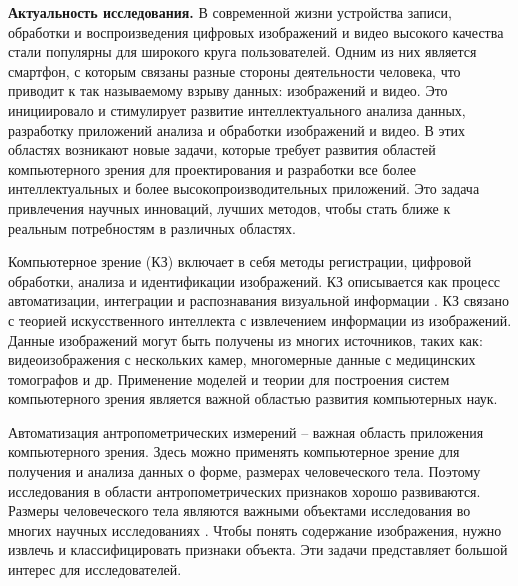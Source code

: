 
\textbf{Актуальность исследования.}
В современной жизни устройства записи, обработки и воспроизведения цифровых изображений и видео высокого качества стали популярны для широкого круга пользователей. Одним из них является смартфон, с которым связаны разные стороны деятельности человека, что приводит к так называемому взрыву данных: изображений и видео. Это инициировало и стимулирует развитие интеллектуального анализа данных, разработку приложений анализа и обработки изображений и видео. В этих областях возникают новые задачи, которые требует развития областей компьютерного зрения для проектирования и разработки все более интеллектуальных и более высокопроизводительных приложений. Это задача привлечения научных инноваций, лучших методов, чтобы стать ближе к реальным потребностям в различных областях.

Компьютерное зрение (КЗ) включает в себя методы регистрации, цифровой обработки, анализа и идентификации изображений. КЗ описывается как процесс автоматизации, интеграции и распознавания визуальной информации \cite{Wang2016,Maria2016,Ioan2011,Lauren2013,Saha2005,Azriel2001}. КЗ связано с теорией искусственного интеллекта с извлечением информации из изображений. Данные изображений могут быть получены из многих источников, таких как: видеоизображения с нескольких камер, многомерные данные с медицинских томографов и др. Применение моделей и теории для построения систем компьютерного зрения является важной областью развития компьютерных наук.

Автоматизация антропометрических измерений – важная область приложения компьютерного зрения. Здесь можно применять компьютерное зрение для получения и анализа данных о форме, размерах человеческого тела. Поэтому исследования в области антропометрических признаков хорошо развиваются. Размеры человеческого тела являются важными объектами исследования во многих научных исследованиях \cite{Paul2011,Michaell2011,Wuhre2014}. Чтобы понять содержание изображения, нужно извлечь и классифицировать признаки объекта. Эти задачи представляет большой интерес для исследователей.

